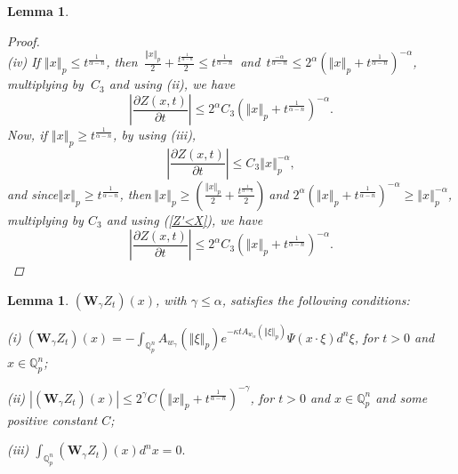 \documentclass{amsart}\usepackage{amsfonts}
\theoremstyle{plain}
\newtheorem{lemma}[theorem]{Lemma}
\numberwithin{equation}{section}
\begin{document}
\begin{lemma}
\begin{proof}
\[\]
(iv) If $\left\Vert x\right\Vert _{p}\leq t^{\frac{1}{\alpha-n}}$,
then\ $\frac{\left\Vert x\right\Vert _{p}}{2}+\frac{t^{\frac{1}{\alpha-n}}}{2}\leq t^{\frac{1}{\alpha-n}}$\ and\ $t^{\frac{-\alpha}{\alpha-n}}\leq2^{\alpha}\left(  \left\Vert x\right\Vert _{p}+t^{\frac{1}{\alpha-n}}\right)  ^{-\alpha}$, multiplying by $\ C_{3}$ and using (ii), we have
\[
\left\vert \frac{\partial Z(x,t)}{\partial t}\right\vert \leq2^{\alpha}C_{3}\left(  \left\Vert x\right\Vert _{p}+t^{\frac{1}{\alpha-n}}\right)
^{-\alpha}.
\]
Now, if $\left\Vert x\right\Vert _{p}\geq t^{\frac{1}{\alpha-n}}$, by using
(iii),
\begin{equation}
\left\vert \frac{\partial Z(x,t)}{\partial t}\right\vert \leq C_{3}\left\Vert
x\right\Vert _{p}^{-\alpha}, \label{Z'<X}\end{equation}
and since$\left\Vert x\right\Vert _{p}\geq t^{\frac{1}{\alpha-n}}$,
then$\ \left\Vert x\right\Vert _{p}\geq\left(  \frac{\left\Vert x\right\Vert
_{p}}{2}+\frac{t^{\frac{1}{\alpha-n}}}{2}\right)  \ $and $2^{\alpha}\left(
\left\Vert x\right\Vert _{p}+t^{\frac{1}{\alpha-n}}\right)  ^{-\alpha}\geq\left\Vert x\right\Vert _{p}^{-\alpha}$, multiplying by $C_{3}$ and using
(\ref{Z'<X}), we have\
\[
\left\vert \frac{\partial Z(x,t)}{\partial t}\right\vert \leq2^{\alpha}C_{3}\left(  \left\Vert x\right\Vert _{p}+t^{\frac{1}{\alpha-n}}\right)
^{-\alpha}.
\]

\end{proof}
\end{lemma}

\begin{lemma}
\label{lemmaWZ}$\left(  \mathbf{W}_{\gamma}Z_{t}\right)  (x)$, with
$\gamma\leq\alpha$, satisfies the following conditions:

(i) $\left(  \mathbf{W}_{\gamma}Z_{t}\right)  (x)=-{\textstyle\int\nolimits_{\mathbb{Q}_{p}^{n}}}
A_{w_{\gamma}}(\left\Vert \xi\right\Vert _{p})e^{-\kappa tA_{w_{\alpha}}(\left\Vert \xi\right\Vert _{p})}\Psi(x\cdot\xi)d^{n}\xi$, for $t>0$ and
$x\in\mathbb{Q}_{p}^{n}$;

(ii) $\left\vert \left(  \boldsymbol{W}_{\gamma}Z_{t}\right)  (x)\right\vert
\leq2^{\gamma}C\left(  \left\Vert x\right\Vert _{p}+t^{\frac{1}{\alpha-n}}\right)  ^{-\gamma}$, for $t>0$ and $x\in\mathbb{Q}_{p}^{n}$ and some
positive constant $C$;

(iii) ${\textstyle\int\nolimits_{\mathbb{Q}_{p}^{n}}}
\left(  \boldsymbol{W}_{\gamma}Z_{t}\right)  (x)d^{n}x=0.$
\end{lemma}
\end{document}
